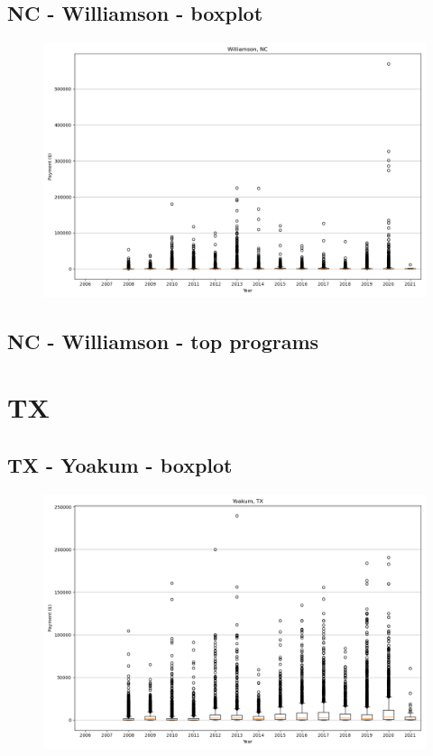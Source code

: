 \subsection*{NC - Williamson - boxplot}
\begin{figure}[h]
\centering
\includegraphics[width=7in]{../output/boxplots/counties/Williamson-NC_boxplot.png}
\end{figure}


\subsection*{NC - Williamson - top programs}

\newpage
\section*{TX}
\subsection*{TX - Yoakum - boxplot}
\begin{figure}[h]
\centering
\includegraphics[width=7in]{../output/boxplots/counties/Yoakum-TX_boxplot.png}
\end{figure}


